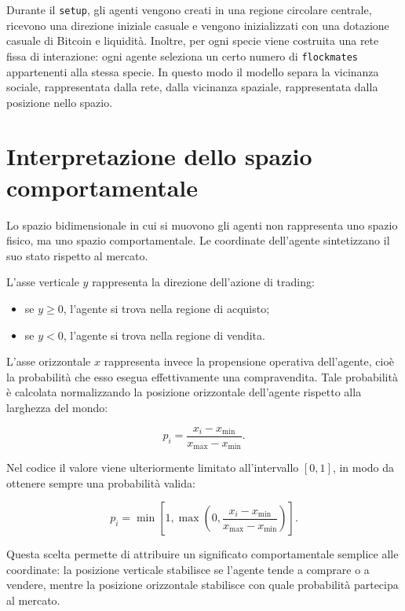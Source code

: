 Durante il \texttt{setup}, gli agenti vengono creati in una regione circolare
centrale, ricevono una direzione iniziale casuale e vengono inizializzati con una
dotazione casuale di Bitcoin e liquidità. Inoltre, per ogni specie viene costruita
una rete fissa di interazione: ogni agente seleziona un certo numero di
\texttt{flockmates} appartenenti alla stessa specie. In questo modo il modello
separa la vicinanza sociale, rappresentata dalla rete, dalla vicinanza spaziale,
rappresentata dalla posizione nello spazio.

\section{Interpretazione dello spazio comportamentale}

Lo spazio bidimensionale in cui si muovono gli agenti non rappresenta uno spazio
fisico, ma uno spazio comportamentale. Le coordinate dell'agente sintetizzano il
suo stato rispetto al mercato.

L'asse verticale \(y\) rappresenta la direzione dell'azione di trading:
\begin{itemize}
    \item se \(y \geq 0\), l'agente si trova nella regione di acquisto;
    \item se \(y < 0\), l'agente si trova nella regione di vendita.
\end{itemize}

L'asse orizzontale \(x\) rappresenta invece la propensione operativa dell'agente,
cioè la probabilità che esso esegua effettivamente una compravendita. Tale
probabilità è calcolata normalizzando la posizione orizzontale dell'agente
rispetto alla larghezza del mondo:

\begin{equation}
    p_i =
    \frac{x_i - x_{\min}}{x_{\max} - x_{\min}}.
\end{equation}

Nel codice il valore viene ulteriormente limitato all'intervallo \([0,1]\), in
modo da ottenere sempre una probabilità valida:

\begin{equation}
    p_i =
    \min\left[
    1,
    \max\left(
    0,
    \frac{x_i - x_{\min}}{x_{\max} - x_{\min}}
    \right)
    \right].
\end{equation}

Questa scelta permette di attribuire un significato comportamentale semplice alle
coordinate: la posizione verticale stabilisce se l'agente tende a comprare o a
vendere, mentre la posizione orizzontale stabilisce con quale probabilità
partecipa al mercato.

